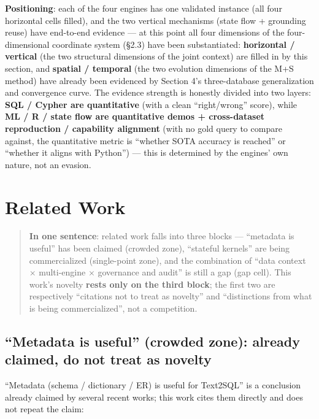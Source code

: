 \documentclass[11pt]{article}
\begin{document}
\textbf{Positioning}: each of the four engines has one validated instance (all four horizontal cells filled), and the two vertical mechanisms (state flow + grounding reuse) have end-to-end evidence --- at this point all four dimensions of the four-dimensional coordinate system (\S{}2.3) have been substantiated: \textbf{horizontal / vertical} (the two structural dimensions of the joint context) are filled in by this section, and \textbf{spatial / temporal} (the two evolution dimensions of the M+S method) have already been evidenced by Section 4's three-database generalization and convergence curve. The evidence strength is honestly divided into two layers: \textbf{SQL / Cypher are quantitative} (with a clean ``right/wrong'' score), while \textbf{ML / R / state flow are quantitative demos + cross-dataset reproduction / capability alignment} (with no gold query to compare against, the quantitative metric is ``whether SOTA accuracy is reached'' or ``whether it aligns with Python'') --- this is determined by the engines' own nature, not an evasion.

\section{Related Work}

\begin{quote}
\textbf{In one sentence}: related work falls into three blocks --- ``metadata is useful'' has been claimed (crowded zone), ``stateful kernels'' are being commercialized (single-point zone), and the combination of ``data context $\times$ multi-engine $\times$ governance and audit'' is still a gap (gap cell). This work's novelty \textbf{rests only on the third block}; the first two are respectively ``citations not to treat as novelty'' and ``distinctions from what is being commercialized'', not a competition.
\end{quote}

\subsection{``Metadata is useful'' (crowded zone): already claimed, do not treat as novelty}

``Metadata (schema / dictionary / ER) is useful for Text2SQL'' is a conclusion already claimed by several recent works; this work cites them directly and does not repeat the claim:
\end{document}
